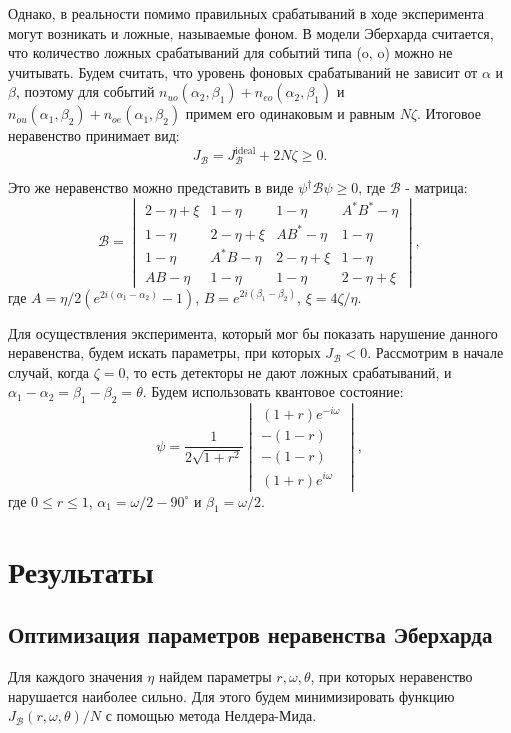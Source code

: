 \documentclass[%
master,         %
subf,           %
href,           %
,times         %
]{disser}
\numberwithin{equation}{section}
\numberwithin{figure}{section}
\begin{document}
Однако, в реальности помимо правильных срабатываний в ходе эксперимента могут возникать и ложные, называемые фоном. В модели Эберхарда считается, что количество ложных срабатываний для событий типа (o, o) можно не учитывать. Будем считать, что уровень фоновых срабатываний не зависит от $\alpha$ и $\beta$, поэтому для событий $n_{uo}(\alpha_2, \beta_1) + n_{eo}(\alpha_2, \beta_1)$ и $n_{ou}(\alpha_1, \beta_2) + n_{oe}(\alpha_1, \beta_2)$ примем его одинаковым и равным $N\zeta$. Итоговое неравенство принимает вид:
\[
J_{\mathcal{B}} = J_{\mathcal{B}}^{\mbox{ideal}} + 2N\zeta \geq 0.
\]

Это же неравенство можно представить в виде $\psi^\dagger\mathcal{B}\psi \geq 0$, где $\mathcal{B}$ - матрица:
\[
\mathcal{B} = 
\begin{vmatrix}
2 - \eta + \xi & 1 - \eta & 1 - \eta & A^*B^* - \eta\\
1 - \eta & 2 - \eta + \xi & AB^* - \eta & 1 - \eta\\
1 - \eta & A^*B - \eta & 2 - \eta + \xi & 1 - \eta\\
AB - \eta & 1 - \eta & 1 - \eta & 2 - \eta + \xi
\end{vmatrix},
\]
где $A = \eta/2(e^{2i(\alpha_1-\alpha_2)} - 1)$, $B = e^{2i(\beta_1 - \beta_2)}$, $\xi = 4\zeta/\eta$.

Для осуществления эксперимента, который мог бы показать нарушение данного неравенства, будем искать параметры, при которых $J_{\mathcal{B}} < 0$. Рассмотрим в начале случай, когда $\zeta = 0$, то есть детекторы не дают ложных срабатываний, и $\alpha_1 - \alpha_2 = \beta_1 - \beta_2 = \theta$. Будем использовать квантовое состояние:
\[
\psi = \frac{1}{2\sqrt{1 + r^2}}
\begin{vmatrix}
(1+r)e^{-i\omega}\\
-(1 - r)\\
-(1 - r)\\
(1 + r)e^{i\omega}
\end{vmatrix},
\]
где $0 \leq r \leq 1$, $\alpha_1 = \omega / 2 - 90^\circ$ и $\beta_1 = \omega / 2$.

\chapter{Результаты}

\section{Оптимизация параметров неравенства Эберхарда}
Для каждого значения $\eta$ найдем параметры $r, \omega, \theta$, при которых неравенство нарушается наиболее сильно. Для этого будем минимизировать функцию $J_{\mathcal{B}}(r, \omega, \theta) / N$ с помощью метода Нелдера-Мида. 
\end{document}
